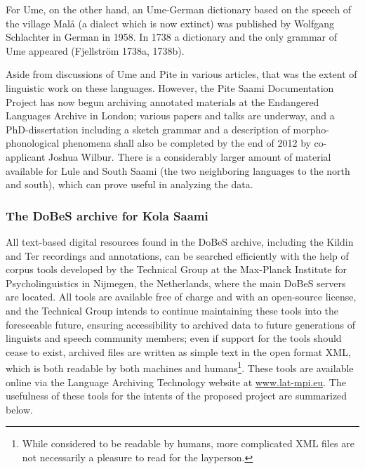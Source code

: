 \documentclass[a4paper,12pt]{article}
\begin{document}
For Ume, on the other hand, an Ume-German dictionary based on the speech of the village Malå (a dialect which is now extinct) was published by Wolfgang Schlachter in German in 1958. In 1738 a dictionary and the only grammar of Ume appeared (Fjellström 1738a, 1738b). 

Aside from discussions of Ume and Pite in various articles, that was the extent of linguistic work on these languages. However, the Pite Saami Documentation Project has now begun archiving annotated materials at the Endangered Languages Archive in London; %
various papers and talks are underway, %
and a PhD-dissertation including a sketch grammar and a description of morpho-phonological phenomena shall also be completed by the end of 2012 by co-applicant Joshua Wilbur. There is a considerably larger amount of material available for Lule and South Saami (the two neighboring languages to the north and south), which can prove useful in analyzing the data.


\subsubsection{The DoBeS archive for Kola Saami}%

All text-based digital resources found in the DoBeS archive, including the Kildin and Ter recordings and annotations, can be searched efficiently with the help of corpus tools developed by the Technical Group at the Max-Planck Institute for Psycholinguistics in Nijmegen, the Netherlands, where the main DoBeS servers are located. All tools are available free of charge and with an open-source license, and the Technical Group intends to continue maintaining these tools into the foreseeable future, ensuring accessibility to archived data to future generations of linguists and speech community members; even if support for the tools should cease to exist, archived files are written as simple text in the open format XML, which is both readable by both machines and humans\footnote{While considered to be readable by humans, more complicated XML files are not necessarily a pleasure to read for the layperson.}. These tools are available online via the Language Archiving Technology website at \url{www.lat-mpi.eu}.%
The usefulness of these tools for the intents of the proposed project are summarized below.
\end{document}
